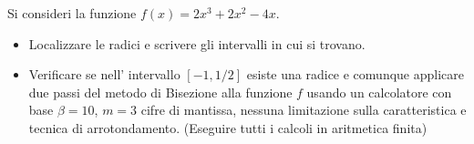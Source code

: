 Si consideri la funzione $f(x)=2x^3+2x^2-4x$.
\begin{itemize}
\item  Localizzare le radici e
scrivere gli intervalli in cui si trovano.
\item Verificare se nell' intervallo $[-1,1/2]$ esiste una radice e comunque applicare due passi del
metodo di Bisezione alla funzione $f$ usando un calcolatore con
base $\beta =10$, $m=3$ cifre di mantissa, nessuna limitazione
sulla caratteristica e tecnica di arrotondamento. (Eseguire tutti
i calcoli in aritmetica finita)
\end{itemize}
